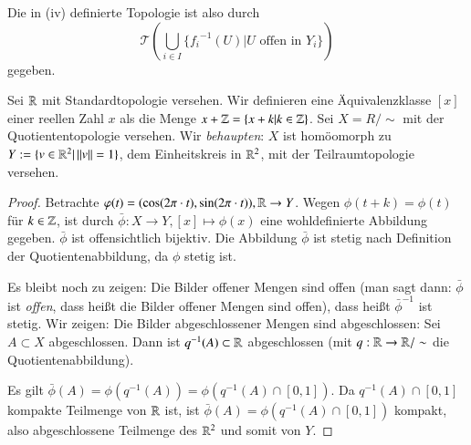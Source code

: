 \documentclass[a4paper,10pt]{scrartcl}
\begin{document}
Die in (iv) definierte Topologie ist also durch
\[
\mathcal T(\bigcup\limits_{i\in I} \{ {f_i}^{-1}(U)|U \text{ offen in } Y_i\} )
\]
gegeben.
\begin{ex}\label{thm:2.6} Sei $ \mathbb{R} $ mit Standardtopologie versehen. Wir definieren eine Äquivalenzklasse $ [x] $ einer reellen Zahl $ x $ als die Menge $x+\mathbb{Z}=\{x+k|k\in \mathbb{Z}\}$. Sei $ X=R/\sim $ mit der Quotiententopologie versehen. Wir \emph{behaupten}: $ X $ ist homöomorph zu $ Y:=\{v\in \mathbb{R}^2|\, ||v||=1\} $, dem Einheitskreis in $ \mathbb{R}^2 $, mit der Teilraumtopologie versehen. \fixme[fig12]
\begin{proof}
Betrachte $ \varphi(t)=(\cos(2\pi\cdot t),\sin(2\pi \cdot t)), \mathbb{R}\to Y $.
Wegen $ \phi(t+k)=\phi(t) $ für $ k\in \mathbb{Z} $, ist durch $ \bar\phi: X\to Y, [x]\mapsto \phi(x) $ eine wohldefinierte Abbildung gegeben. $\bar \phi$ ist offensichtlich bijektiv. Die Abbildung $ \bar \phi  $ ist stetig nach Definition der Quotientenabbildung, da $ \phi $ stetig ist.

Es bleibt noch zu zeigen: Die Bilder offener Mengen sind offen (man sagt dann: $ \bar \phi $ ist \emph{offen}, dass heißt die Bilder offener Mengen sind offen), dass heißt $ \bar \phi^{-1} $ ist stetig. Wir zeigen: Die Bilder abgeschlossener Mengen sind abgeschlossen: Sei $ A\subset X $ abgeschlossen. Dann ist $ q^{-1}(A)\subset \mathbb{R} $ abgeschlossen (mit $ q: \mathbb{R} \to \mathbb{R}/\sim $ die Quotientenabbildung).

Es gilt $ \bar \phi(A)=\phi(q^{-1}(A))=\phi(q^{-1}(A)\cap[0,1]) $. Da $ q^{-1}(A)\cap [0,1] $ kompakte Teilmenge von $ \mathbb{R} $ ist, ist $ \bar\phi(A)=\phi(q^{-1}(A)\cap[0,1]) $ kompakt, also abgeschlossene Teilmenge des $ \mathbb{R}^2  $ und somit von $ Y $.
\end{proof}
\end{ex}
\end{document}
